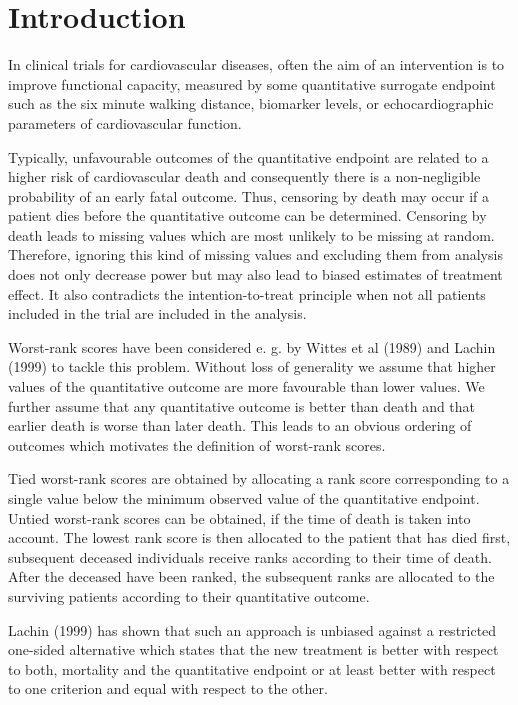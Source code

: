\documentclass[bimj,fleqn]{w-art}
\theoremstyle{plain}
\theoremstyle{definition}
\begin{document}



\section{Introduction}
\label{sec:Intro}

In clinical trials for cardiovascular diseases, often the aim of an
intervention is to improve functional capacity, measured by some quantitative
surrogate endpoint such as the six minute walking distance, biomarker levels,
or echocardiographic parameters of cardiovascular function.

Typically, unfavourable outcomes of the quantitative endpoint are related to a
higher risk of cardiovascular death and consequently there is a non-negligible
probability of an early fatal outcome. Thus, censoring by
death may occur if a patient dies before the quantitative outcome can be
determined. Censoring by death leads to missing values which are most unlikely
to be missing at random. Therefore, ignoring this kind of missing values and
excluding them from analysis does not only decrease power but may also lead to
biased estimates of treatment effect. It also contradicts the
intention-to-treat principle when not all patients included in the trial are
included in the analysis.

Worst-rank scores have been considered e. g. by Wittes et al (1989) and Lachin
(1999) to tackle this problem. Without loss of generality we assume that
higher values of the quantitative outcome are more favourable than lower
values. We further assume that any quantitative outcome is better than death
and that earlier death is worse than later death. This leads to an obvious
ordering of outcomes which motivates the definition of worst-rank scores.

Tied worst-rank scores are obtained by allocating a rank score corresponding
to a single value below the minimum observed value of the quantitative
endpoint. Untied worst-rank scores can be obtained, if the time of death is
taken into account. The lowest rank score is then allocated to the patient
that has died first, subsequent deceased individuals receive ranks according
to their time of death. After the deceased have been ranked, the subsequent
ranks are allocated to the surviving patients according to their quantitative
outcome.

Lachin (1999) has shown that such an approach is unbiased against a restricted
one-sided alternative which states that the new treatment is better with
respect to both, mortality and the quantitative endpoint or at least better
with respect to one criterion and equal with respect to the other.
\end{document}
